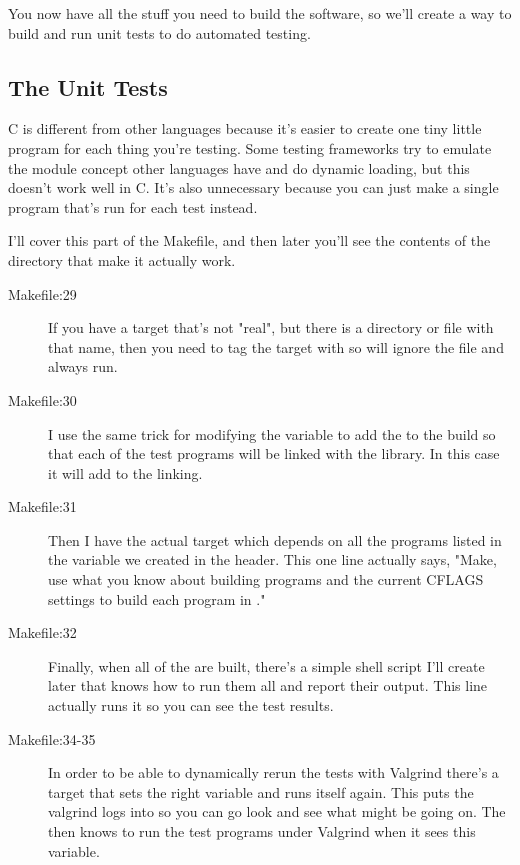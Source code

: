 You now have all the stuff you need to build the software, so we'll create a
way to build and run unit tests to do automated testing.

\subsection{The Unit Tests}

C is different from other languages because it's easier to create one tiny little
program for each thing you're testing.  Some testing frameworks try to emulate
the module concept other languages have and do dynamic loading, but this doesn't
work well in C.  It's also unnecessary because you can just make a single program
that's run for each test instead.

I'll cover this part of the Makefile, and then later you'll see the contents of
the  directory that make it actually work.

\begin{description}
\item[Makefile:29] If you have a target that's not "real", but there is a directory
    or file with that name, then you need to tag the target with 
    so  will ignore the file and always run.
\item[Makefile:30] I use the same trick for modifying the  variable
    to add the  to the build so that each of the test programs
    will be linked with the  library.  In this case it will add
     to the linking.
\item[Makefile:31] Then I have the actual  target which depends 
    on all the programs listed in the  variable we created 
    in the header.  This one line actually says, "Make, use what you know
    about building programs and the current CFLAGS settings to build each
    program in ."
\item[Makefile:32] Finally, when all of the  are built, there's
    a simple shell script I'll create later that knows how to run them all
    and report their output.  This line actually runs it so you can see
    the test results.
\item[Makefile:34-35] In order to be able to dynamically rerun the tests 
    with Valgrind there's a  target that sets the right
    variable and runs itself again.  This puts the valgrind logs into
     so you can go look and see what might be
    going on.  The  then knows to run the
    test programs under Valgrind when it sees this  variable.
\end{description}


